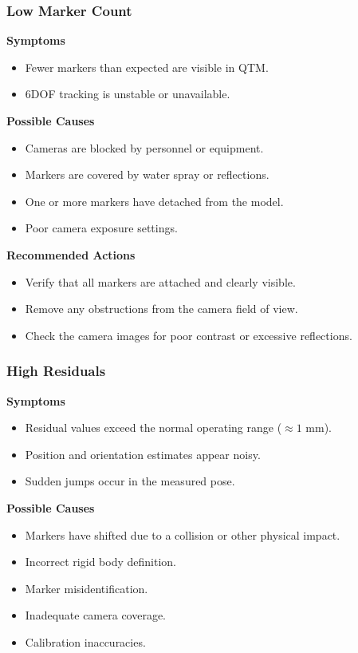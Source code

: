 \documentclass[12pt,a4paper]{article}
\begin{document}
\subsubsection{Low Marker Count}

\textbf{Symptoms}
\begin{itemize}
	\item Fewer markers than expected are visible in QTM.
	\item 6DOF tracking is unstable or unavailable.
\end{itemize}

\textbf{Possible Causes}
\begin{itemize}
	\item Cameras are blocked by personnel or equipment.
	\item Markers are covered by water spray or reflections.
	\item One or more markers have detached from the model.
	\item Poor camera exposure settings.
\end{itemize}

\textbf{Recommended Actions}
\begin{itemize}
	\item Verify that all markers are attached and clearly visible.
	\item Remove any obstructions from the camera field of view.
	\item Check the camera images for poor contrast or excessive reflections.
\end{itemize}

\subsubsection{High Residuals}

\textbf{Symptoms}
\begin{itemize}
	\item Residual values exceed the normal operating range ($\approx 1$ mm).
	\item Position and orientation estimates appear noisy.
	\item Sudden jumps occur in the measured pose.
\end{itemize}

\textbf{Possible Causes}
\begin{itemize}
	\item Markers have shifted due to a collision or other physical impact.
	\item Incorrect rigid body definition.
	\item Marker misidentification.
	\item Inadequate camera coverage.
	\item Calibration inaccuracies.
\end{itemize}
\end{document}
